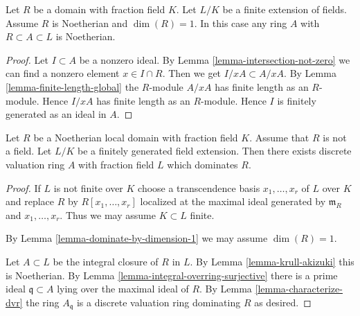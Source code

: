 \begin{lemma}
\label{lemma-krull-akizuki}
Let $R$ be a domain with fraction field $K$.
Let $L/K$ be a finite extension of fields.
Assume $R$ is Noetherian and $\dim(R) = 1$.
In this case any ring $A$ with $R \subset A \subset L$ is
Noetherian.
\end{lemma}

\begin{proof}
Let $I \subset A$ be a nonzero ideal. By
Lemma \ref{lemma-intersection-not-zero}
we can find a nonzero element $x \in I \cap R$.
Then we get $I/xA \subset A/xA$. By Lemma \ref{lemma-finite-length-global}
the $R$-module $A/xA$ has finite length as an $R$-module. Hence
$I/xA$ has finite length as an $R$-module. Hence $I$ is finitely
generated as an ideal in $A$.
\end{proof}

\begin{lemma}
\label{lemma-exists-dvr}
Let $R$ be a Noetherian local domain with fraction field $K$.
Assume that $R$ is not a field.
Let $L/K$ be a finitely generated field extension.
Then there exists discrete valuation ring $A$ with fraction field
$L$ which dominates $R$.
\end{lemma}

\begin{proof}
If $L$ is not finite over $K$ choose a transcendence basis
$x_1, \ldots, x_r$ of $L$ over $K$ and replace $R$ by
$R[x_1, \ldots, x_r]$ localized at the maximal ideal
generated by $\mathfrak m_R$ and $x_1, \ldots, x_r$.
Thus we may assume $K \subset L$ finite.

\medskip\noindent
By Lemma \ref{lemma-dominate-by-dimension-1} we may assume $\dim(R) = 1$.

\medskip\noindent
Let $A \subset L$ be the integral closure of $R$ in $L$.
By Lemma \ref{lemma-krull-akizuki} this is Noetherian.
By Lemma \ref{lemma-integral-overring-surjective} there
is a prime ideal $\mathfrak q \subset A$ lying
over the maximal ideal of $R$.
By Lemma \ref{lemma-characterize-dvr} the ring $A_{\mathfrak q}$ is a discrete
valuation ring dominating $R$ as desired.
\end{proof}








